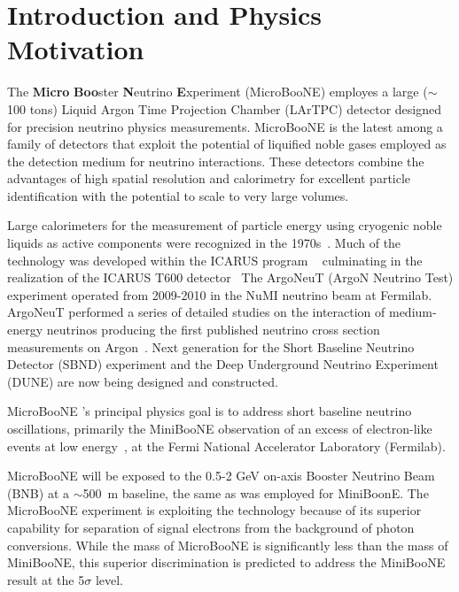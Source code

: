 \section{Introduction and Physics Motivation}

The {\bf{Micro}} {\bf{Boo}}ster {\bf{N}}eutrino {\bf{E}}xperiment (MicroBooNE) employes a large ($\sim$100 tons) Liquid Argon Time Projection Chamber (LArTPC) detector designed for precision neutrino physics measurements.   MicroBooNE is the latest among a family of detectors that exploit the potential of liquified noble gases employed as the detection medium for neutrino interactions.   These detectors combine the advantages of high spatial resolution and calorimetry for excellent particle identification with the potential to scale to very large volumes. 

Large calorimeters for the measurement of particle energy using cryogenic noble liquids as active components were recognized in the 1970s~\cite{Willis:1974}.  Much of the \lartpc technology was developed within the ICARUS program ~\cite{Benetti:1993-3ton,Cennini:1994-3ton,Arneodo:1999-50l} culminating in the realization of the ICARUS T600 detector~\cite{Amerio:2004-T600}   The ArgoNeuT (ArgoN Neutrino Test) experiment operated from 2009-2010 in the NuMI neutrino beam at Fermilab.   ArgoNeuT performed a series of detailed studies on the interaction of medium-energy neutrinos \cite{Acciarri:2013-argoneut-recomb}  producing the first published neutrino cross section measurements on Argon~\cite{Anderson:2012-argoneut-CCincl,Acciarri:2014-argoneut-CCxsec,Acciarri:2014eit}.   Next generation \lartpcs for the Short Baseline Neutrino Detector (SBND) experiment and the Deep Underground Neutrino Experiment (DUNE) are now being designed and constructed.   
   
MicroBooNE 's principal physics goal is to address short baseline neutrino oscillations, primarily the MiniBooNE observation of an excess of electron-like events at low energy~\cite{AguilarArevalo:2008rc}, at the Fermi National Accelerator Laboratory (Fermilab).  


MicroBooNE will be exposed to the  0.5-2 GeV on-axis Booster Neutrino Beam (BNB) at a $\sim$500~m baseline, the same as was employed for MiniBoonE.  The MicroBooNE experiment is exploiting the \lartpc technology because of its superior capability for separation of signal electrons from the background of photon conversions.   While the mass of MicroBooNE is significantly less than the mass of MiniBooNE, this superior discrimination is predicted to address the MiniBooNE result at the 5$\sigma$ level.   

